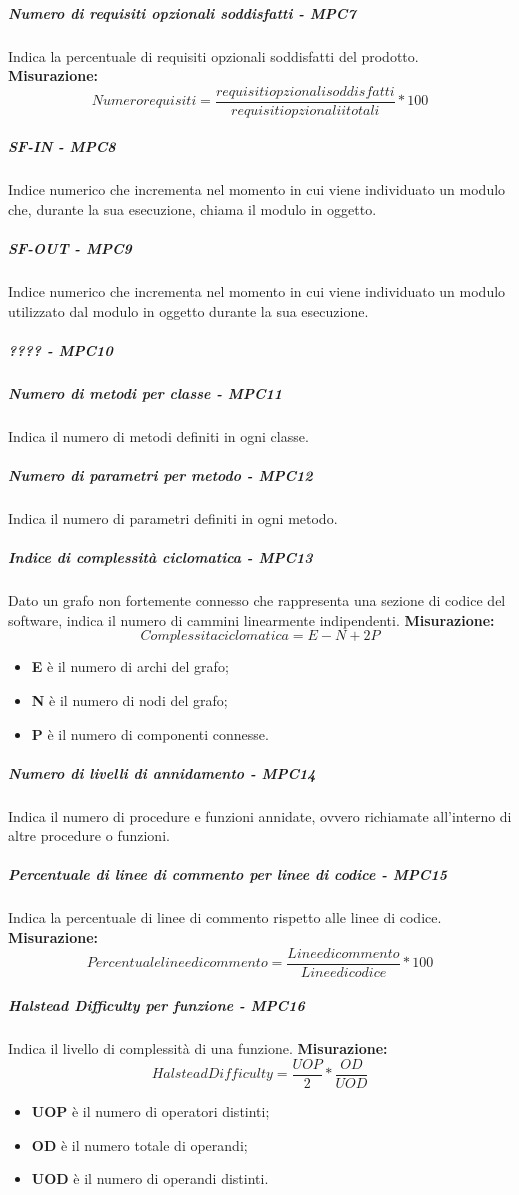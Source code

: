 \subparagraph{Numero di requisiti opzionali soddisfatti - MPC7}
Indica la percentuale di requisiti opzionali soddisfatti del prodotto.
\textbf{Misurazione:}\begin{equation}
Numero requisiti = \frac{requisiti opzionali soddisfatti}{requisiti opzionalii totali} * 100
\end{equation}
\subparagraph{SF-IN - MPC8}
Indice numerico che incrementa nel momento in cui viene individuato un modulo che, durante la sua esecuzione, chiama il modulo in oggetto.
\subparagraph{SF-OUT - MPC9}
Indice numerico che incrementa nel momento in cui viene individuato un modulo utilizzato dal modulo in oggetto durante la sua esecuzione.
\subparagraph{???? - MPC10}

\subparagraph{Numero di metodi per classe - MPC11}
Indica il numero di metodi definiti in ogni classe.
\subparagraph{Numero di parametri per metodo - MPC12}
Indica il numero di parametri definiti in ogni metodo.
\subparagraph{Indice di complessità ciclomatica - MPC13}
Dato un grafo non fortemente connesso che rappresenta una sezione di codice del software, indica il numero di cammini linearmente indipendenti.
\textbf{Misurazione:}\begin{equation}
Complessita ciclomatica = E - N + 2P
\end{equation}
\begin{itemize}
	\item \textbf{E} è il numero di archi del grafo;
	\item \textbf{N} è il numero di nodi del grafo;
	\item \textbf{P} è il numero di componenti connesse.
\end{itemize}
\subparagraph{Numero di livelli di annidamento - MPC14}
Indica il numero di procedure e funzioni annidate, ovvero richiamate all'interno di altre procedure o funzioni.
\subparagraph{Percentuale di linee di commento per linee di codice - MPC15}
Indica la percentuale di linee di commento rispetto alle linee di codice.
\textbf{Misurazione:}\begin{equation}
Percentuale linee di commento = \frac{Linee di commento}{Linee di codice} * 100
\end{equation}
\subparagraph{Halstead Difficulty per funzione - MPC16}
Indica il livello di complessità di una funzione.
\textbf{Misurazione:}\begin{equation}
Halstead Difficulty = \frac{UOP}{2} * \frac{OD}{UOD}
\end{equation}	
\begin{itemize}
	\item \textbf{UOP} è il numero di operatori distinti;
	\item \textbf{OD} è il numero totale di operandi;
	\item \textbf{UOD} è il numero di operandi distinti.
\end{itemize}
